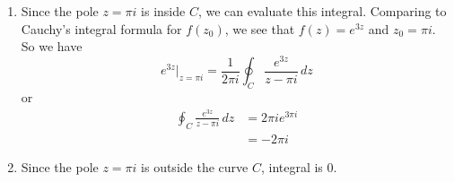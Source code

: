 \documentclass{article}
\theoremstyle{definition}
\begin{document}
	\begin{prob}{5.32} $  $
		\begin{enumerate}[label=\alph*.)]
			\item Since the pole $ z = \pi i $ is inside $ C $, we can evaluate this integral. Comparing to Cauchy's integral formula for $ f(z_0) $, we see that $ f(z) = e^{3z} $ and $ z_0 = \pi i $. So we have 
				\[
					e^{3z} \Big|_{z=\pi i} = \frac{1}{2\pi i} \oint_C \frac{e^{3z}}{z-\pi i} \, dz
				\]
				or
				\begin{align*}
					\oint_C \frac{e^{3z}}{z-\pi i} \, dz &= 2\pi i e^{3\pi i} \\
					&= -2\pi i
				\end{align*}
			\item Since the pole $ z=\pi i $ is outside the curve $ C $, integral is 0.
		\end{enumerate}
	\end{prob}





































	
\end{document}

